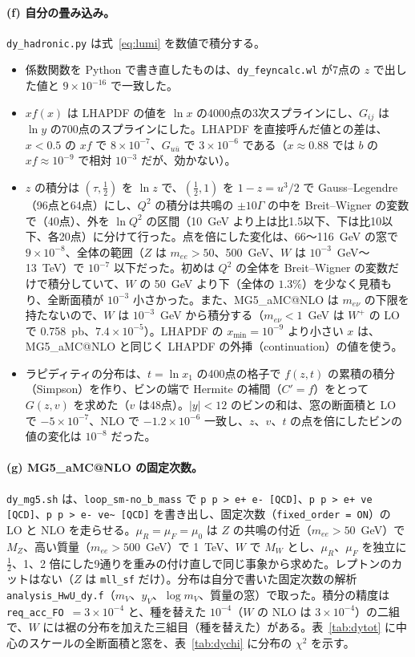 \documentclass[a4paper,10pt]{ltjsarticle}
\makeatletter
\newcommand{\MGaMC}{MG5\_aMC@NLO}
\makeatother
\begin{document}
\paragraph{(f) 自分の畳み込み。}\texttt{dy\_hadronic.py} は式~\eqref{eq:lumi} を数値で積分する。
\begin{itemize}
\item 係数関数を Python で書き直したものは、\texttt{dy\_feyncalc.wl} が7点の $z$ で出した値と $9\times10^{-16}$ で一致した。
\item $xf(x)$ は LHAPDF の値を $\ln x$ の4000点の3次スプラインにし、$G_{ij}$ は $\ln y$ の700点のスプラインにした。LHAPDF を直接呼んだ値との差は、$x<0.5$ の $xf$ で $8\times10^{-7}$、$G_{u\bar u}$ で $3\times10^{-6}$ である（$x\approx0.88$ では $b$ の $xf\approx10^{-9}$ で相対 $10^{-3}$ だが、効かない）。
\item $z$ の積分は $(\tau,\frac12)$ を $\ln z$ で、$(\frac12,1)$ を $1-z=u^3/2$ で Gauss--Legendre（96点と64点）にし、$Q^2$ の積分は共鳴の $\pm10\Gamma$ の中を Breit--Wigner の変数で（40点）、外を $\ln Q^2$ の区間（10~GeV より上は比1.5以下、下は比10以下、各20点）に分けて行った。点を倍にした変化は、66〜116~GeV の窓で $9\times10^{-8}$、全体の範囲（$Z$ は $m_{ee}>50$、500~GeV、$W$ は $10^{-3}$~GeV〜13~TeV）で $10^{-7}$ 以下だった。初めは $Q^2$ の全体を Breit--Wigner の変数だけで積分していて、$W$ の 50~GeV より下（全体の $1.3\%$）を少なく見積もり、全断面積が $10^{-3}$ 小さかった。また、\MGaMC{} は $m_{e\nu}$ の下限を持たないので、$W$ は $10^{-3}$~GeV から積分する（$m_{e\nu}<1$~GeV は $W^+$ の LO で 0.758~pb、$7.4\times10^{-5}$）。LHAPDF の $x_{\min}=10^{-9}$ より小さい $x$ は、\MGaMC{} と同じく LHAPDF の外挿（continuation）の値を使う。
\item ラピディティの分布は、$t=\ln x_1$ の400点の格子で $f(z,t)$ の累積の積分（Simpson）を作り、ビンの端で Hermite の補間（$C'=f$）をとって $G(z,v)$ を求めた（$v$ は48点）。$|y|<12$ のビンの和は、窓の断面積と LO で $-5\times10^{-7}$、NLO で $-1.2\times10^{-6}$ 一致し、$z$、$v$、$t$ の点を倍にしたビンの値の変化は $10^{-8}$ だった。
\end{itemize}

\paragraph{(g) \MGaMC{} の固定次数。}\texttt{dy\_mg5.sh} は、\texttt{loop\_sm-no\_b\_mass} で \texttt{p p > e+ e- [QCD]}、\texttt{p p > e+ ve [QCD]}、\texttt{p p > e- ve\textasciitilde{} [QCD]} を書き出し、固定次数（\texttt{fixed\_order = ON}）の LO と NLO を走らせる。$\mu_R=\mu_F=\mu_0$ は $Z$ の共鳴の付近（$m_{ee}>50$~GeV）で $M_Z$、高い質量（$m_{ee}>500$~GeV）で 1~TeV、$W$ で $M_W$ とし、$\mu_R$、$\mu_F$ を独立に $\frac12$、1、2 倍にした9通りを重みの付け直しで同じ事象から求めた。レプトンのカットはない（$Z$ は \texttt{mll\_sf} だけ）。分布は自分で書いた固定次数の解析 \texttt{analysis\_HwU\_dy.f}（$m_V$、$y_V$、$\log m_V$、質量の窓）で取った。積分の精度は \texttt{req\_acc\_FO}~$=3\times10^{-4}$ と、種を替えた $10^{-4}$（$W$ の NLO は $3\times10^{-4}$）の二組で、$W$ には裾の分布を加えた三組目（種を替えた）がある。表~\ref{tab:dytot} に中心のスケールの全断面積と窓を、表~\ref{tab:dychi} に分布の $\chi^2$ を示す。
\end{document}
